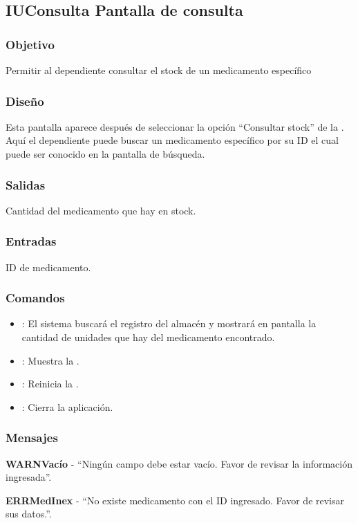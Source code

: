 \subsection{IUConsulta Pantalla de consulta}

\subsubsection{Objetivo}
	Permitir al dependiente consultar el stock de un medicamento espec\'ifico

\subsubsection{Diseño}
	Esta pantalla aparece despu\'es de seleccionar la opci\'on "`Consultar stock"' de la \label{IUCompra}. Aqu\'i el dependiente puede buscar un medicamento espec\'ifico por su ID el cual puede ser conocido en la pantalla de b\'usqueda.


\subsubsection{Salidas}

	Cantidad del medicamento que hay en stock.

\subsubsection{Entradas}
ID de medicamento.

\subsubsection{Comandos}
\begin{itemize}
		\item {}: El sistema buscar\'a el registro del almac\'en y mostrar\'a en pantalla la cantidad de unidades que hay del medicamento encontrado.
				\item {}: Muestra la \label{IUCompra}.
		\item {}: Reinicia la \label{IUConsulta}.
		\item {}: Cierra la aplicaci\'on.
\end{itemize}

\subsubsection{Mensajes}
	\begin{Citemize}
		\item {\bf WARNVac\'io} - "`Ning\'un campo debe estar vac\'io. Favor de revisar la informaci\'on ingresada"'.
		\item {\bf ERRMedInex} - "`No existe medicamento con el ID ingresado. Favor de revisar sus datos."'.
	\end{Citemize}
